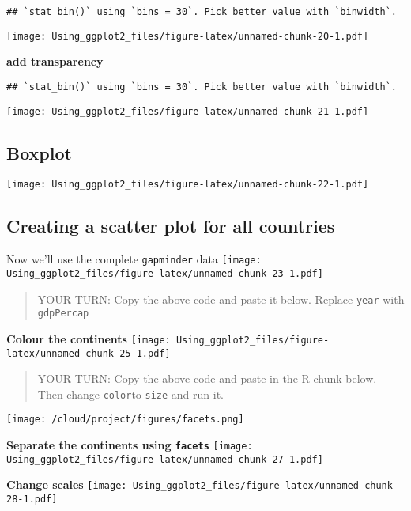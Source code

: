 \documentclass[]{article}
\begin{document}
\begin{verbatim}
## `stat_bin()` using `bins = 30`. Pick better value with `binwidth`.
\end{verbatim}

\texttt{[image: Using\_ggplot2\_files/figure-latex/unnamed-chunk-20-1.pdf]}

\textbf{add transparency}

\begin{verbatim}
## `stat_bin()` using `bins = 30`. Pick better value with `binwidth`.
\end{verbatim}

\texttt{[image: Using\_ggplot2\_files/figure-latex/unnamed-chunk-21-1.pdf]}

\hypertarget{boxplot}{%
\subsection{Boxplot}\label{boxplot}}

\texttt{[image: Using\_ggplot2\_files/figure-latex/unnamed-chunk-22-1.pdf]}

\hypertarget{creating-a-scatter-plot-for-all-countries}{%
\subsection{Creating a scatter plot for all
countries}\label{creating-a-scatter-plot-for-all-countries}}

Now we'll use the complete \texttt{gapminder} data
\texttt{[image: Using\_ggplot2\_files/figure-latex/unnamed-chunk-23-1.pdf]}

\begin{quote}
YOUR TURN: Copy the above code and paste it below. Replace \texttt{year}
with \texttt{gdpPercap}
\end{quote}

\textbf{Colour the continents}
\texttt{[image: Using\_ggplot2\_files/figure-latex/unnamed-chunk-25-1.pdf]}

\begin{quote}
YOUR TURN: Copy the above code and paste in the R chunk below. Then
change \texttt{color}to \texttt{size} and run it.
\end{quote}

\texttt{[image: /cloud/project/figures/facets.png]}

\textbf{Separate the continents using \texttt{facets}}
\texttt{[image: Using\_ggplot2\_files/figure-latex/unnamed-chunk-27-1.pdf]}

\textbf{Change scales}
\texttt{[image: Using\_ggplot2\_files/figure-latex/unnamed-chunk-28-1.pdf]}
\end{document}
